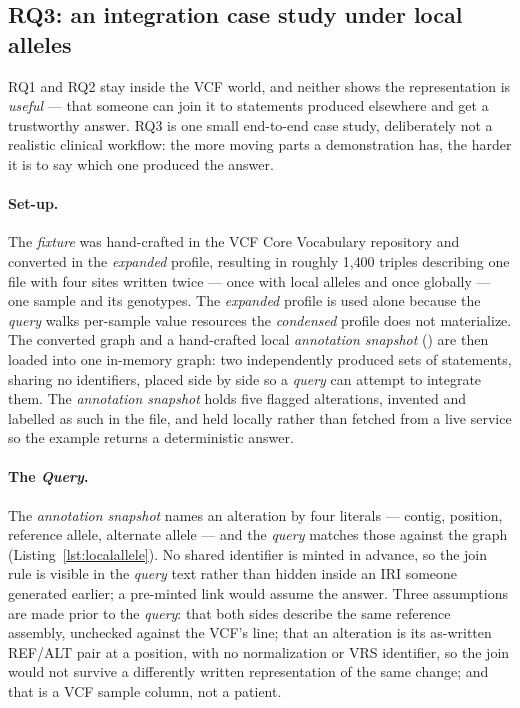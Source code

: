 \subsection{RQ3: an integration case study under local alleles}
\label{sec:m-rq3}

RQ1 and RQ2 stay inside the VCF world, and neither shows the representation is \emph{useful} --- that someone can join it to statements produced elsewhere and get a trustworthy answer.
RQ3 is one small end-to-end case study, deliberately not a realistic clinical workflow: the more moving parts a demonstration has, the harder it is to say which one produced the answer.

\paragraph{Set-up.}
The \emph{fixture}  was hand-crafted in the VCF Core Vocabulary repository and converted in the \textit{expanded} profile, resulting in roughly 1{,}400 triples describing one file with four sites written twice --- once with local alleles and once globally --- one sample and its genotypes.
The \textit{expanded} profile is used alone because the \emph{query} walks per-sample value resources the \textit{condensed} profile does not materialize.
The converted graph and a hand-crafted local \textit{annotation snapshot} () are then loaded into one in-memory graph: two independently produced sets of statements, sharing no identifiers, placed side by side so a \emph{query} can attempt to integrate them.
The \textit{annotation snapshot} holds five flagged alterations, invented and labelled as such in the file, and held locally rather than fetched from a live service so the example returns a deterministic answer.

\paragraph{The \emph{Query}.}
The \textit{annotation snapshot} names an alteration by four literals --- contig, position, reference allele, alternate allele --- and the \emph{query} matches those against the graph (Listing~\ref{lst:localallele}).
No shared identifier is minted in advance, so the join rule is visible in the \emph{query} text rather than hidden inside an IRI someone generated earlier; a pre-minted link would assume the answer.
Three assumptions are made prior to the \emph{query}: that both sides describe the same reference assembly, unchecked against the VCF's  line; that an alteration is its as-written REF/ALT pair at a position, with no normalization or VRS identifier, so the join would not survive a differently written representation of the same change; and that  is a VCF sample column, not a patient.

